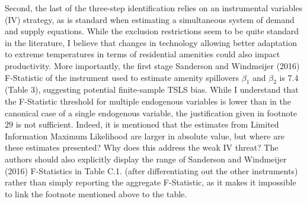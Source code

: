 \documentclass[10pt, final]{article}
\begin{document}
Second, the last of the three-step identification relies on an instrumental variables (IV) strategy, as is standard when estimating a simultaneous system of demand and supply equations. 
While the exclusion restrictions seem to be quite standard in the literature, I believe that changes in technology allowing better adaptation to extreme temperatures in terms of residential amenities could also impact productivity.
More importantly, the first stage Sanderson and Windmeijer (2016) F-Statistic of the instrument used to estimate amenity spillovers $\beta_1$ and $\beta_2$ is 7.4 (Table 3), suggesting potential finite-sample TSLS bias. While I understand that the F-Statistic threshold for multiple endogenous variables is lower than in the canonical case of a single endogenous variable, the justification given in footnote $29$ is not sufficient. Indeed, it is mentioned that the estimates from Limited Information Maximum Likelihood are larger in absolute value, but where are these estimates presented? Why does this address the weak IV threat? The authors should also explicitly display the range of Sanderson and Windmeijer (2016) F-Statistics in Table C.1. (after differentiating out the other instruments) rather than simply reporting the aggregate F-Statistic, as it makes it impossible to link the footnote mentioned above to the table.
\\
\end{document}
